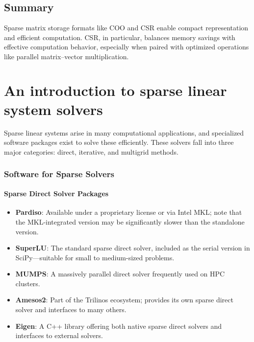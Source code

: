 \documentclass[11pt,a4paper]{book}
\begin{document}
\section*{Summary}

Sparse matrix storage formats like COO and CSR enable compact representation and efficient computation. CSR, in particular, balances memory savings with effective computation behavior, especially when paired with optimized operations like parallel matrix–vector multiplication.

\chapter{An introduction to sparse linear system solvers}

Sparse linear systems arise in many computational applications, and specialized software packages exist to solve these efficiently. These solvers fall into three major categories: direct, iterative, and multigrid methods.

\subsection*{Software for Sparse Solvers}

\subsubsection*{Sparse Direct Solver Packages}
\begin{itemize}
  \item \textbf{Pardiso}: Available under a proprietary license or via Intel MKL; note that the MKL-integrated version may be significantly slower than the standalone version.
  \item \textbf{SuperLU}: The standard sparse direct solver, included as the serial version in SciPy—suitable for small to medium-sized problems.
  \item \textbf{MUMPS}: A massively parallel direct solver frequently used on HPC clusters.
  \item \textbf{Amesos2}: Part of the Trilinos ecosystem; provides its own sparse direct solver and interfaces to many others.
  \item \textbf{Eigen}: A C++ library offering both native sparse direct solvers and interfaces to external solvers.
\end{itemize}
\end{document}
